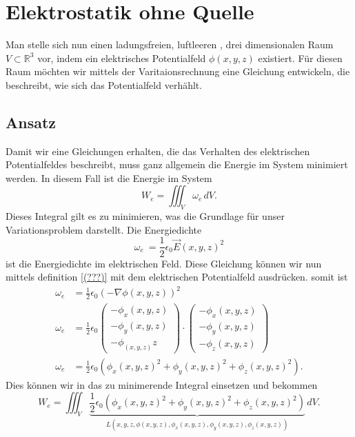 \section{Elektrostatik ohne Quelle
	\label{maxwell:section:elektrostatik_ohne_quelle}}
Man stelle sich nun einen ladungsfreien, luftleeren , drei dimensionalen Raum $V\subset\mathbb{R}^3$
vor, indem ein elektrisches Potentialfeld $\phi(x,y,z)$ existiert.
Für diesen Raum möchten wir mittels der Varitaionsrechnung eine Gleichung entwickeln, die beschreibt, wie sich das Potentialfeld verhählt. 

\subsection{Ansatz}
Damit wir eine Gleichungen erhalten, die das Verhalten des elektrischen Potentialfeldes beschreibt, muss ganz allgemein die Energie im System minimiert werden. 
In diesem Fall ist die Energie im System
\[
W_e
=
\iiint_V \omega_e\, dV.
\]
Dieses Integral gilt es zu minimieren, was die Grundlage für unser Variationsproblem darstellt.
Die Energiedichte
\[
\omega_e\
=
\frac{1}{2}\epsilon_0\vec{E}(x,y,z)^2
\]
ist die Energiedichte im elektrischen Feld.
Diese Gleichung können wir nun mittels definition \ref{(???)} mit dem elektrischen Potentialfeld ausdrücken.
somit ist
\begin{align}
\omega_e
&=
\frac{1}{2}\epsilon_0\left(-\nabla\phi(x,y,z)\right)^2
\\
\omega_e
&=
\frac{1}{2}\epsilon_0
\begin{pmatrix}
-\phi_x(x,y,z)\\
-\phi_y(x,y,z)\\
-\phi_(x,y,z)z
\end{pmatrix}
\cdot
\begin{pmatrix}
-\phi_x(x,y,z)\\
-\phi_y(x,y,z)\\
-\phi_z(x,y,z)
\end{pmatrix}
\\
\omega_e
&=
\frac{1}{2}\epsilon_0\left(\phi_x(x,y,z)^2 + \phi_y(x,y,z)^2 + \phi_z(x,y,z)^2\right).
\label{maxwell:section:energiedichte}
\end{align}
Dies können wir in das zu minimerende Integral einsetzen und bekommen
\begin{equation}
	W_e
	=
	\iiint_V \underbrace{
		\frac{1}{2}\epsilon_0\left(\phi_x(x,y,z)^2 + \phi_y(x,y,z)^2 + \phi_z(x,y,z)^2\right)}_{L(x,y,z,\phi(x,y,z),\phi_x(x,y,z),\phi_y(x,y,z),\phi_z(x,y,z))}\, dV.
	\label{maxwell:section:energieintegral_quellenfrei}
\end{equation}
